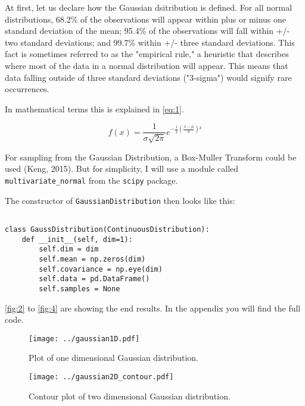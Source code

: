 \documentclass{CPSReport}
\begin{document}
At first, let us declare how the Gaussian dsitribution is defined.
For all normal distributions, 68.2\% of the observations will appear within plus or minus one standard deviation of the mean; 95.4\% of the observations will fall within +/- two standard deviations; and 99.7\% within +/- three standard deviations. This fact is sometimes referred to as the "empirical rule," a heuristic that describes where most of the data in a normal distribution will appear.
This means that data falling outside of three standard deviations ("3-sigma") would signify rare occurrences.

In mathematical terms this is explained in \autoref{eq:1}.

\begin{equation} \label{eq:1}
    f(x)=\frac{1}{\sigma \sqrt{2\pi } } e^{-\frac{1}{2}(\frac{x-\mu}{\sigma})²}
\end{equation}

For sampling from the Gaussian Distribution, a Box-Muller Transform could be used (Keng, 2015).
But for simplicity, I will use a module called \texttt{multivariate_normal} from the \texttt{scipy} package.

The constructor of \texttt{GaussianDistribution} then looks like this:

\begin{verbatim}

class GaussDistribution(ContinuousDistribution):
    def __init__(self, dim=1):
        self.dim = dim
        self.mean = np.zeros(dim)
        self.covariance = np.eye(dim)
        self.data = pd.DataFrame()
        self.samples = None
\end{verbatim}

\autoref{fig:2} to \autoref{fig:4} are showing the end results.
In the appendix you will find the full code.

\begin{figure}[ht]
    \begin{center}
        \texttt{[image: ../gaussian1D.pdf]}
    \end{center}
    \caption{Plot of one dimensional Gaussian distribution.}
    \label{fig:2}
\end{figure}

\begin{figure}[ht]
    \begin{center}
        \texttt{[image: ../gaussian2D\_contour.pdf]}
    \end{center}
    \caption{Contour plot of two dimensional Gaussian distribution.}
    \label{fig:3}
\end{figure}
\end{document}
